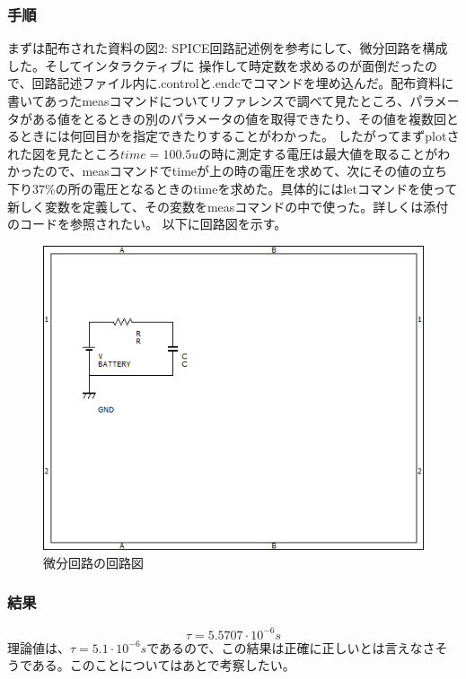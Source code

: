 \documentclass{jsarticle}
\begin{document}
\subsubsection{手順}
まずは配布された資料の図2: SPICE回路記述例を参考にして、微分回路を構成した。そしてインタラクティブに
操作して時定数を求めるのが面倒だったので、回路記述ファイル内に.controlと.endcでコマンドを埋め込んだ。配布資料に書いてあったmeasコマンドについてリファレンスで調べて見たところ、パラメータがある値をとるときの別のパラメータの値を取得できたり、その値を複数回とるときには何回目かを指定できたりすることがわかった。
したがってまずplotされた図を見たところ$time=100.5u$の時に測定する電圧は最大値を取ることがわかったので、measコマンドでtimeが上の時の電圧を求めて、次にその値の立ち下り$37\%$の所の電圧となるときのtimeを求めた。具体的にはletコマンドを使って新しく変数を定義して、その変数をmeasコマンドの中で使った。詳しくは添付のコードを参照されたい。
以下に回路図を示す。
\begin{figure}[H]
    \centering
    \includegraphics[bb=0 0 500 400]{ex1_dif.png}
    \caption{微分回路の回路図}
\end{figure}

\subsubsection{結果}
\begin{equation}
    \tau = 5.5707 \cdot 10^{-6} s
\end{equation}
理論値は、$\tau = 5.1 \cdot 10^{-6} s$であるので、この結果は正確に正しいとは言えなさそうである。このことについてはあとで考察したい。
\end{document}
